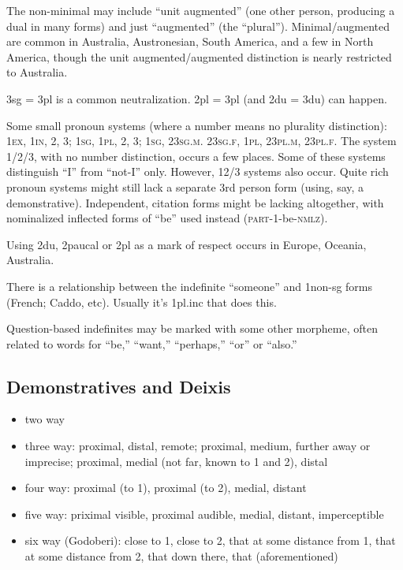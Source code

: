 \documentclass[11pt]{article}
\newcommand{\I}[1]{\textsc{#1}}   %
\newenvironment{grammarlist}%
 {\begin{itemize}\addtolength{\itemsep}{-0.5\baselineskip}\ignorespaces}%
 {\end{itemize}\ignorespacesafterend}
\begin{document}
\noindent The non-minimal may include ``unit augmented'' (one other
person, producing a dual in many forms) and just ``augmented'' (the
``plural'').  Minimal/augmented are common in Australia, Austronesian,
South America, and a few in North America, though the unit
augmented/augmented distinction is nearly restricted to Australia.

3sg = 3pl is a common neutralization.  2pl = 3pl (and 2du = 3du) can
happen.

Some small pronoun systems (where a number means no plurality
distinction): \I{1ex, 1in, 2, 3; 1sg, 1pl, 2, 3; 1sg, 23sg.m. 23sg.f,
1pl, 23pl.m, 23pl.f}.  The system 1/2/3, with no number distinction,
occurs a few places.  Some of these systems distinguish ``I'' from
``not-I'' only.  However, 12/3 systems also occur.  Quite rich pronoun
systems might still lack a separate 3rd person form (using, say, a
demonstrative).  Independent, citation forms might be lacking
altogether, with nominalized inflected forms of ``be'' used instead
(\I{part-1}-be-\I{nmlz}).

Using 2du, 2paucal or 2pl as a mark of respect occurs in Europe,
Oceania, Australia.

There is a relationship between the indefinite ``someone'' and
1non-sg forms (French; Caddo, etc).  Usually it's 1pl.inc that does
this. 

Question-based indefinites may be marked with some other morpheme,
often related to words for ``be,'' ``want,'' ``perhaps,'' ``or'' or
``also.''


\subsection{Demonstratives and Deixis}

\begin{grammarlist}
  \item two way
  \item three way: proximal, distal, remote; proximal, medium, further
    away or imprecise; proximal, medial (not far, known to 1 and 2),
    distal
  \item four way: proximal (to 1), proximal (to 2), medial, distant
  \item five way: priximal visible, proximal audible, medial, distant,
    imperceptible
  \item six way (Godoberi): close to 1, close to 2, that at some
    distance from 1, that at some distance from 2, that down there,
    that (aforementioned)
\end{grammarlist}
\end{document}
